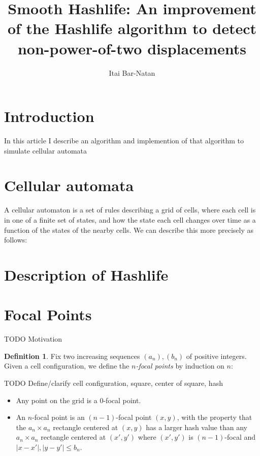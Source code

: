 \documentclass{article}
\theoremstyle{definition}
\newtheorem{definition}{Definition}
\begin{document}
\title{Smooth Hashlife: An improvement of the Hashlife algorithm to detect
non-power-of-two displacements}
\author{Itai Bar-Natan}
\maketitle

\section{Introduction}

In this article I describe an algorithm and implemention of that algorithm to
simulate cellular automata

\section{Cellular automata}

A cellular automaton is a set of rules describing a grid of cells, where each
cell is in one of a finite set of states, and how the state each cell changes
over time as a function of the states of the nearby cells. We can describe this
more precisely as follows: 

\section{Description of Hashlife}

\section{Focal Points}

TODO Motivation

\begin{definition}
Fix two increasing sequences $(a_n), (b_n)$ of positive integers. Given a cell
configuration, we define the \emph{$n$-focal points} by induction on $n$:

TODO Define/clarify cell configuration, square, center of square, hash

\begin{itemize}
\item Any point on the grid is a $0$-focal point.
\item An $n$-focal point is an $(n-1)$-focal point $(x, y)$, with the property
that the $a_n \times a_n$ rectangle centered at $(x, y)$ has a larger hash value
than any $a_n \times a_n$ rectangle centered at $(x', y')$ where $(x', y')$ is
$(n-1)$-focal and $|x - x'|, |y - y'| \leq b_n$.
\end{itemize}
\end{definition}
\end{document}
